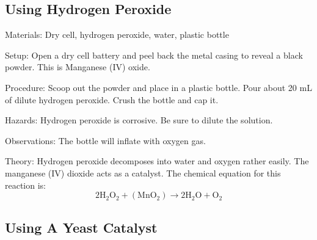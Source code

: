 \begin{multicols}{2}
\subsection{Using Hydrogen Peroxide}


\begin{description*}
\item[Materials:]{Dry cell, hydrogen peroxide, water, plastic bottle}
\item[Setup:]{Open a dry cell battery and peel back the metal casing to reveal a black powder. This is Manganese (IV) oxide. }
\item[Procedure:]{Scoop out the powder and place in a plastic bottle. Pour about 20 mL of dilute hydrogen peroxide. Crush the bottle and cap it.}
\item[Hazards:]{Hydrogen peroxide is corrosive. Be sure to dilute the solution.}
\item[Observations:]{The bottle will inflate with oxygen gas.}
\item[Theory:]{Hydrogen peroxide decomposes into water and oxygen rather easily. The manganese (IV) dioxide acts as a catalyst. The chemical equation for this reaction is: \[ 2\mathrm{H}_2\mathrm{O}_2 + ( \mathrm{Mn}\mathrm{O}_2 ) \longrightarrow 2\mathrm{H}_2\mathrm{O} + \mathrm{O}_2  \]}
\end{description*}

\subsection{Using A Yeast Catalyst} %



\end{multicols}
